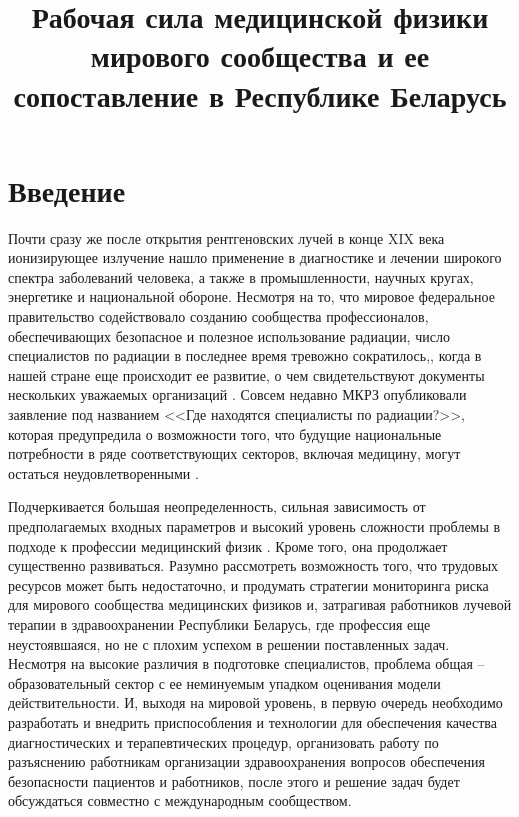 \documentclass[a4paper,10pt]{extarticle}
\title{Рабочая сила медицинской физики мирового сообщества и ее 
сопоставление в Республике Беларусь} %
\begin{document}
\maketitle


\section{Введение}{\parindent 1.27cm}

Почти сразу же после открытия рентгеновских лучей в конце XIX века \cite{W. C. Röntgen} ионизирующее излучение нашло применение в диагностике и лечении широкого спектра заболеваний человека, а также в промышленности, научных кругах, энергетике и национальной обороне. Несмотря на то, что мировое федеральное правительство содействовало созданию сообщества профессионалов, обеспечивающих безопасное и полезное использование радиации, число специалистов по радиации в последнее время тревожно сократилось,, когда в нашей стране еще происходит ее развитие, о чем свидетельствуют документы нескольких уважаемых организаций \cite{USGAO 2014}\cite{HPS 2013}\cite{NCRP 2015}. Совсем недавно МКРЗ опубликовали заявление под названием <<Где находятся специалисты по радиации?>>, которая предупредила о возможности того, что будущие национальные потребности в ряде соответствующих секторов, включая медицину, могут остаться неудовлетворенными \cite{NCRP 2015}.

Подчеркивается большая неопределенность, сильная зависимость от предполагаемых входных параметров и высокий уровень сложности проблемы в подходе к профессии медицинский физик \cite{Mills MD.2014}. Кроме того, она продолжает существенно развиваться. Разумно рассмотреть возможность того, что трудовых ресурсов может быть недостаточно, и продумать стратегии мониторинга риска для мирового сообщества медицинских физиков и, затрагивая работников лучевой терапии в здравоохранении Республики Беларусь, где профессия еще неустоявшаяся, но не с плохим успехом в решении поставленных задач. Несмотря на высокие различия в подготовке специалистов, проблема общая -- образовательный сектор с ее неминуемым упадком оценивания модели действительности. И, выходя на мировой уровень, в первую очередь необходимо разработать и внедрить приспособления и технологии для обеспечения качества диагностических и терапевтических процедур, организовать работу по разъяснению работникам организации здравоохранения вопросов обеспечения безопасности пациентов и работников, после этого и решение задач будет обсуждаться совместно с международным сообществом.
\end{document}
